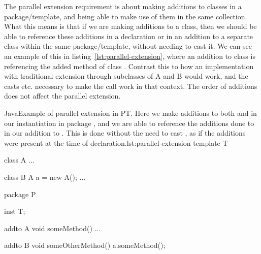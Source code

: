 The parallel extension requirement is about making additions to classes in a package/template, and being able to make use of them in the same collection.
What this means is that if we are making additions to a class, then we should be able to reference these additions in a declaration or in an addition to a separate class within the same package/template, without needing to cast it.
We can see an example of this in listing~\vref{lst:parallel-extension}, where an addition to class  is referencing the added method of class .
Contrast this to how an implementation with traditional extension through subclasses of A and B would work, and the casts etc. necessary to make the call  work in that context.
The order of additions does not affect the parallel extension.

\begin{code}{Java}{Example of parallel extension in PT. Here we make additions to both  and  in our instantiation in package , and we are able to reference the additions done to  in our addition to . This is done without the need to cast , as if the additions were present at the time of declaration.}{lst:parallel-extension}
    template T {
        class A {
            ...
        }

        class B {
            A a = new A();
            ...
        }
    }

    package P {
        inst T;

        addto A {
            void someMethod() {
                ...
            }
        }

        addto B {
            void someOtherMethod() {
                a.someMethod();
            }
        }
    }
\end{code}

